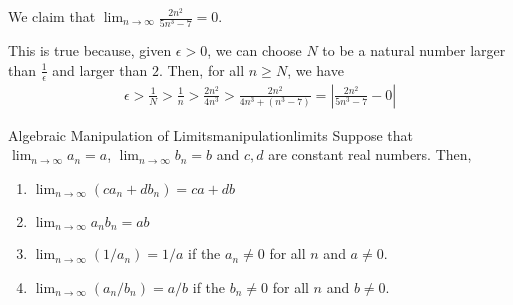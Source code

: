 
\begin{exmp}{}{}
	We claim that \(\lim_{n\to\infty} \frac{2n^2}{5n^3 - 7} = 0\).

	This is true because, given  \(\epsilon > 0\), we can choose \(N\) to be a natural number larger than \(\frac{1}{\epsilon}\) and larger than \(2\). Then, for all  \(n \geq N\), we have \begin{align*}
		\epsilon > \frac{1}{N} > \frac{1}{n} > \frac{2n^2}{4n^3} > \frac{2n^2}{4n^3 + (n^3 - 7)} = \left| \frac{2n^2}{5n^3 - 7} - 0 \right|
	\end{align*}
\end{exmp}

\begin{thm}{Algebraic Manipulation of Limits}{manipulationlimits}
	Suppose that \(\lim_{n\to\infty} a_n = a\), \(\lim_{n\to\infty} b_n = b\) and \(c, d\) are constant real numbers. Then, 
	\begin{enumerate}
		\item \(\lim_{n\to\infty} (ca_n + db_n) = ca + db\)
		\item \(\lim_{n\to\infty} a_nb_n = ab\)
		\item \(\lim_{n\to\infty} (1/a_n) = 1/a\) if the \(a_n \neq 0\) for all  \(n\) and \(a \neq 0\).
		\item \(\lim_{n\to\infty} (a_n/b_n) = a/b\) if the \(b_n \neq 0\) for all  \(n\) and \(b \neq 0\).
	\end{enumerate} 
\end{thm}

